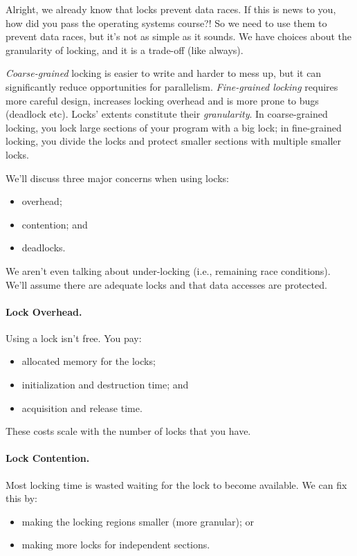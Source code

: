 \documentclass[a4paper]{report}
\begin{document}
Alright, we already know that locks prevent data races. If this is news to you, how did you pass the operating systems course?! So we need to use them to prevent data races, but it's not as simple as it sounds. We have choices about the granularity of locking, and it is a trade-off (like always).

\textit{Coarse-grained} locking is easier to write and harder to mess up, but it can significantly reduce opportunities for parallelism. \textit{
Fine-grained locking} requires more careful design,
increases locking overhead and is more prone to bugs (deadlock etc).  
Locks' extents constitute their {\it granularity}. In coarse-grained locking, you
lock large sections of your program with a big lock; in fine-grained
locking, you divide the locks and protect smaller sections with multiple smaller locks.

We'll discuss three major concerns when using locks:
  \begin{itemize}
    \item overhead;
    \item contention; and
    \item deadlocks.
  \end{itemize}
We aren't even talking about under-locking (i.e., remaining race conditions). We'll assume there are adequate locks and that data accesses are protected. 

\paragraph{Lock Overhead.}
  Using a lock isn't free. You pay:
  \begin{itemize}
    \item allocated memory for the locks;
    \item initialization and destruction time; and
    \item acquisition and release time.
  \end{itemize}
  These costs scale with the number of locks that you have.

\paragraph{Lock Contention.}
 Most locking time is wasted waiting for the lock to become available.
We can fix this by:
      \begin{itemize}
        \item making the locking regions smaller (more granular); or
        \item making more locks for independent sections.
      \end{itemize}
\end{document}

